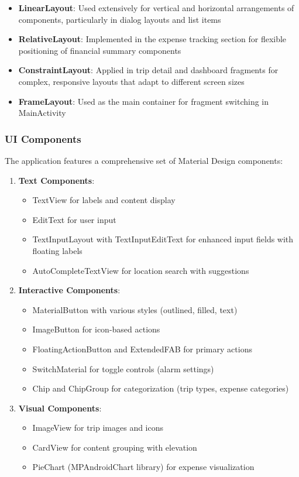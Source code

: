 \documentclass[12pt,a4paper]{article}
\begin{document}
\begin{itemize}
    \item \textbf{LinearLayout}: Used extensively for vertical and horizontal arrangements of components, particularly in dialog layouts and list items
    \item \textbf{RelativeLayout}: Implemented in the expense tracking section for flexible positioning of financial summary components
    \item \textbf{ConstraintLayout}: Applied in trip detail and dashboard fragments for complex, responsive layouts that adapt to different screen sizes
    \item \textbf{FrameLayout}: Used as the main container for fragment switching in MainActivity
\end{itemize}

\subsubsection{UI Components}
The application features a comprehensive set of Material Design components:

\begin{enumerate}
    \item \textbf{Text Components}:
    \begin{itemize}
        \item TextView for labels and content display
        \item EditText for user input
        \item TextInputLayout with TextInputEditText for enhanced input fields with floating labels
        \item AutoCompleteTextView for location search with suggestions
    \end{itemize}

    \item \textbf{Interactive Components}:
    \begin{itemize}
        \item MaterialButton with various styles (outlined, filled, text)
        \item ImageButton for icon-based actions
        \item FloatingActionButton and ExtendedFAB for primary actions
        \item SwitchMaterial for toggle controls (alarm settings)
        \item Chip and ChipGroup for categorization (trip types, expense categories)
    \end{itemize}

    \item \textbf{Visual Components}:
    \begin{itemize}
        \item ImageView for trip images and icons
        \item CardView for content grouping with elevation
        \item PieChart (MPAndroidChart library) for expense visualization
    \end{itemize}
\end{enumerate}
\end{document}
